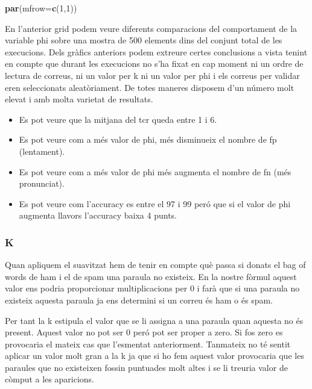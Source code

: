 \documentclass[]{article}
\newenvironment{Shaded}{\begin{snugshade}}{\end{snugshade}}
\newcommand{\DataTypeTok}[1]{\textcolor[rgb]{0.13,0.29,0.53}{#1}}
\newcommand{\DecValTok}[1]{\textcolor[rgb]{0.00,0.00,0.81}{#1}}
\newcommand{\KeywordTok}[1]{\textcolor[rgb]{0.13,0.29,0.53}{\textbf{#1}}}
\newcommand{\NormalTok}[1]{#1}
\providecommand{\tightlist}{%
  \setlength{\itemsep}{0pt}\setlength{\parskip}{0pt}}
\begin{document}
\begin{Shaded}
\begin{Highlighting}[]
\KeywordTok{par}\NormalTok{(}\DataTypeTok{mfrow=}\KeywordTok{c}\NormalTok{(}\DecValTok{1}\NormalTok{,}\DecValTok{1}\NormalTok{))}
\end{Highlighting}
\end{Shaded}

En l'anterior grid podem veure diferents comparacions del comportament
de la variable phi sobre una mostra de 500 elements dins del conjunt
total de les execucions. Dels gràfics anteriors podem extreure certes
conclusions a vista tenint en compte que durant les execucions no s'ha
fixat en cap moment ni un ordre de lectura de correus, ni un valor per k
ni un valor per phi i els correus per validar eren seleccionats
aleatòriament. De totes maneres disposem d'un número molt elevat i amb
molta varietat de resultats.

\begin{itemize}
\tightlist
\item
  Es pot veure que la mitjana del tcr queda entre 1 i 6.
\item
  Es pot veure com a més valor de phi, més disminueix el nombre de fp
  (lentament).
\item
  Es pot veure com a més valor de phi més augmenta el nombre de fn (més
  pronunciat).
\item
  Es pot veure com l'accuracy es entre el 97 i 99 peró que si el valor
  de phi augmenta llavors l'accuracy baixa 4 punts.
\end{itemize}

\hypertarget{k}{%
\subsubsection{K}\label{k}}

Quan apliquem el suavitzat hem de tenir en compte què passa si donats el
bag of words de ham i el de spam una paraula no existeix. En la nostre
fòrmul aquest valor ens podria proporcionar multiplicacions per 0 i farà
que si una paraula no existeix aquesta paraula ja ens determini si un
correu és ham o és spam.

Per tant la k estipula el valor que se li assigna a una paraula quan
aquesta no és present. Aquest valor no pot ser 0 peró pot ser proper a
zero. Si fos zero es provocaria el mateix cas que l'esmentat
anteriorment. Tanmateix no té sentit aplicar un valor molt gran a la k
ja que si ho fem aquest valor provocaria que les paraules que no
existeixen fossin puntuades molt altes i se li treuria valor de còmput a
les aparicions.
\end{document}
